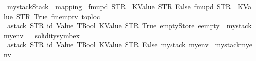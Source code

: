 \begin{isabellebody}
\isamarkupfalse%
\ {\isachardoublequoteopen}mystack{}{\isacharcolon}{\kern0pt}{\isacharcolon}{\kern0pt}Stack\ {\isasymequiv}\ {\isasymlparr}mapping\ {\isacharequal}{\kern0pt}\ fmupd\ {\isacharparenleft}{\kern0pt}STR\ {\isacharprime}{\kern0pt}{\isacharprime}{\kern0pt}{}{\isacharprime}{\kern0pt}{\isacharprime}{\kern0pt}{\isacharparenright}{\kern0pt}\ {\isacharparenleft}{\kern0pt}KValue\ STR\ {\isacharprime}{\kern0pt}{\isacharprime}{\kern0pt}False{\isacharprime}{\kern0pt}{\isacharprime}{\kern0pt}{\isacharparenright}{\kern0pt}\ {\isacharparenleft}{\kern0pt}fmupd\ {\isacharparenleft}{\kern0pt}STR\ {\isacharprime}{\kern0pt}{\isacharprime}{\kern0pt}{}{\isacharprime}{\kern0pt}{\isacharprime}{\kern0pt}{\isacharparenright}{\kern0pt}\ {\isacharparenleft}{\kern0pt}KValue\ STR\ {\isacharprime}{\kern0pt}{\isacharprime}{\kern0pt}True{\isacharprime}{\kern0pt}{\isacharprime}{\kern0pt}{\isacharparenright}{\kern0pt}\ fmempty{\isacharparenright}{\kern0pt}{\isacharcomma}{\kern0pt}\ toploc\ {\isacharequal}{\kern0pt}\ {}{\isasymrparr}{\isachardoublequoteclose}\isanewline
\isanewline
{}\isamarkupfalse%
\ {\isachardoublequoteopen}astack\ {\isacharparenleft}{\kern0pt}STR\ {\isacharprime}{\kern0pt}{\isacharprime}{\kern0pt}id{}{\isacharprime}{\kern0pt}{\isacharprime}{\kern0pt}{\isacharparenright}{\kern0pt}\ {\isacharparenleft}{\kern0pt}Value\ TBool{\isacharparenright}{\kern0pt}\ {\isacharparenleft}{\kern0pt}KValue\ {\isacharparenleft}{\kern0pt}STR\ {\isacharprime}{\kern0pt}{\isacharprime}{\kern0pt}True{\isacharprime}{\kern0pt}{\isacharprime}{\kern0pt}{\isacharparenright}{\kern0pt}{\isacharparenright}{\kern0pt}\ {\isacharparenleft}{\kern0pt}emptyStore{\isacharcomma}{\kern0pt}\ eempty{\isacharparenright}{\kern0pt}\ {\isacharequal}{\kern0pt}\ {\isacharparenleft}{\kern0pt}mystack{\isacharcomma}{\kern0pt}myenv{\isacharparenright}{\kern0pt}{\isachardoublequoteclose}%
\isadelimproof
\ %
\endisadelimproof
%
\isatagproof
{}\isamarkupfalse%
\ solidity{\isacharunderscore}{\kern0pt}symbex%
\endisatagproof
{\isafoldproof}%
%
\isadelimproof
%
\endisadelimproof
\isanewline
{}\isamarkupfalse%
\ {\isachardoublequoteopen}astack\ {\isacharparenleft}{\kern0pt}STR\ {\isacharprime}{\kern0pt}{\isacharprime}{\kern0pt}id{}{\isacharprime}{\kern0pt}{\isacharprime}{\kern0pt}{\isacharparenright}{\kern0pt}\ {\isacharparenleft}{\kern0pt}Value\ TBool{\isacharparenright}{\kern0pt}\ {\isacharparenleft}{\kern0pt}KValue\ {\isacharparenleft}{\kern0pt}STR\ {\isacharprime}{\kern0pt}{\isacharprime}{\kern0pt}False{\isacharprime}{\kern0pt}{\isacharprime}{\kern0pt}{\isacharparenright}{\kern0pt}{\isacharparenright}{\kern0pt}\ {\isacharparenleft}{\kern0pt}mystack{\isacharcomma}{\kern0pt}\ myenv{\isacharparenright}{\kern0pt}\ {\isacharequal}{\kern0pt}\ {\isacharparenleft}{\kern0pt}mystack{}{\isacharcomma}{\kern0pt}myenv{}{\isacharparenright}{\kern0pt}{\isachardoublequoteclose}%

\end{isabellebody}
